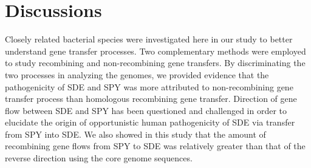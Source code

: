 \documentclass[english]{article}
\begin{document}




\clearpage{}


\section{Discussions}
Closely related bacterial species were investigated here in our study to better
understand gene transfer processes. Two complementary methods were employed to
study recombining and non-recombining gene transfers. By discriminating the two
processes in analyzing the genomes, we provided evidence that the pathogenicity
of SDE and SPY was more attributed to non-recombining gene transfer process than
homologous recombining gene transfer.  Direction of gene flow between SDE and
SPY has been questioned and challenged
\citep{Kalia2001,Kalia2004,Towers2004,Bessen2005,Davies2007,Bessen2010} in order
to elucidate the origin of opportunistic human pathogenicity of SDE via transfer
from SPY into SDE.  We also showed in this study that the amount of recombining
gene flows from SPY to SDE was relatively greater than that of the reverse
direction using the core genome sequences.
\end{document}
